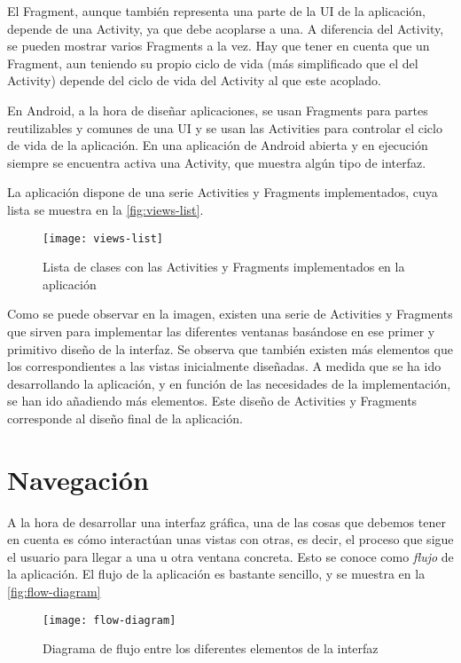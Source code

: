 El Fragment, aunque también representa una parte de la UI de la aplicación, depende de una Activity, ya que debe acoplarse a una. A diferencia del Activity, se pueden mostrar varios Fragments a la vez. Hay que tener en cuenta que un Fragment, aun teniendo su propio ciclo de vida (más simplificado que el del Activity) depende del ciclo de vida del Activity al que este acoplado. 

En Android, a la hora de diseñar aplicaciones, se usan Fragments para partes reutilizables y comunes de una UI y se usan las Activities para controlar el ciclo de vida de la aplicación. En una aplicación de Android abierta y en ejecución siempre se encuentra activa una Activity, que muestra algún tipo de interfaz.

La aplicación dispone de una serie Activities y Fragments implementados, cuya lista se muestra en la \autoref{fig:views-list}.

\begin{figure}[t]
	\centering
	\texttt{[image: views-list]}
	\caption{Lista de clases con las Activities y Fragments implementados en la aplicación}
	\label{fig:views-list}
\end{figure}

Como se puede observar en la imagen, existen una serie de Activities y Fragments que sirven para implementar las diferentes ventanas basándose en ese primer y primitivo diseño de la interfaz. Se observa que también existen más elementos que los correspondientes a las vistas inicialmente diseñadas. A medida que se ha ido desarrollando la aplicación, y en función de las necesidades de la implementación, se han ido añadiendo más elementos. Este diseño de Activities y Fragments corresponde al diseño final de la aplicación.

\section{Navegación}

A la hora de desarrollar una interfaz gráfica, una de las cosas que debemos tener en cuenta es cómo interactúan unas vistas con otras, es decir, el proceso que sigue el usuario para llegar a una u otra ventana concreta. Esto se conoce como \textit{flujo} de la aplicación. El flujo de la aplicación es bastante sencillo, y se muestra en la \autoref{fig:flow-diagram}

\begin{figure}[H]
	\centering
	\texttt{[image: flow-diagram]}
	\caption{Diagrama de flujo entre los diferentes elementos de la interfaz}
	\label{fig:flow-diagram}
\end{figure}

